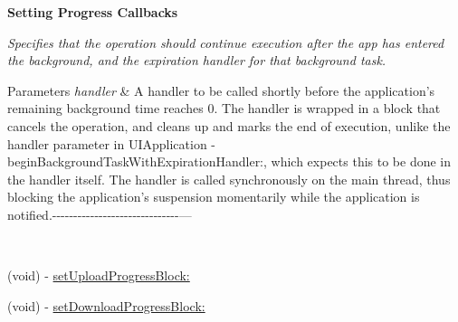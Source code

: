 \begin{Indent}{\bf Setting Progress Callbacks}\par
{\em Specifies that the operation should continue execution after the app has entered the background, and the expiration handler for that background task.


\begin{DoxyParams}{Parameters}
{\em handler} & A handler to be called shortly before the application’s remaining background time reaches 0. The handler is wrapped in a block that cancels the operation, and cleans up and marks the end of execution, unlike the {\ttfamily handler} parameter in {\ttfamily U\+I\+Application -\/begin\+Background\+Task\+With\+Expiration\+Handler\+:}, which expects this to be done in the handler itself. The handler is called synchronously on the main thread, thus blocking the application’s suspension momentarily while the application is notified.-\/-\/-\/-\/-\/-\/-\/-\/-\/-\/-\/-\/-\/-\/-\/-\/-\/-\/-\/-\/-\/-\/-\/-\/-\/-\/-\/-\/-\/-\/--- 

 \\
\hline
\end{DoxyParams}
}\begin{DoxyCompactItemize}
\item 
(void) -\/ \hyperlink{interface_a_f_u_r_l_connection_operation_a040eae410e8de94ac027e536cd2b8ba2}{set\+Upload\+Progress\+Block\+:}
\item 
(void) -\/ \hyperlink{interface_a_f_u_r_l_connection_operation_a513c9c960b7245caa1a50b978314e504}{set\+Download\+Progress\+Block\+:}
\end{DoxyCompactItemize}
\end{Indent}
